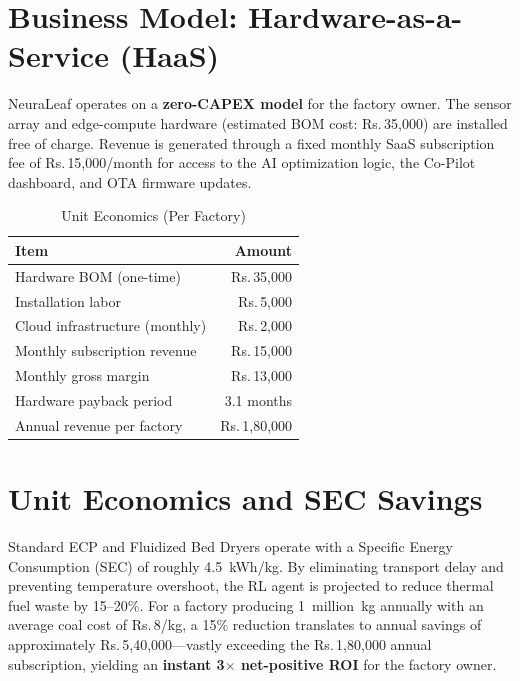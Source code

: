 ﻿\documentclass[12pt, a4paper]{report}
\newcommand{\rupee}{\textrm{Rs.\,}}
\begin{document}
\section{Business Model: Hardware-as-a-Service (HaaS)}
NeuraLeaf operates on a \textbf{zero-CAPEX model} for the factory owner. The sensor array and edge-compute hardware (estimated BOM cost: \rupee 35,000) are installed free of charge. Revenue is generated through a fixed monthly SaaS subscription fee of \rupee 15,000/month for access to the AI optimization logic, the Co-Pilot dashboard, and OTA firmware updates.

\begin{table}[H]
\centering
\caption{Unit Economics (Per Factory)}
\label{tab:unit_econ}
\begin{tabular}{@{}lr@{}}
\toprule
\textbf{Item} & \textbf{Amount} \\
\midrule
Hardware BOM (one-time) & \rupee 35,000 \\
Installation labor & \rupee 5,000 \\
Cloud infrastructure (monthly) & \rupee 2,000 \\
Monthly subscription revenue & \rupee 15,000 \\
Monthly gross margin & \rupee 13,000 \\
Hardware payback period & 3.1 months \\
Annual revenue per factory & \rupee 1,80,000 \\
\bottomrule
\end{tabular}
\end{table}

\section{Unit Economics and SEC Savings}
Standard ECP and Fluidized Bed Dryers operate with a Specific Energy Consumption (SEC) of roughly 4.5~kWh/kg. By eliminating transport delay and preventing temperature overshoot, the RL agent is projected to reduce thermal fuel waste by 15--20\%. For a factory producing 1~million~kg annually with an average coal cost of \rupee 8/kg, a 15\% reduction translates to annual savings of approximately \rupee 5,40,000---vastly exceeding the \rupee 1,80,000 annual subscription, yielding an \textbf{instant 3$\times$ net-positive ROI} for the factory owner.
\end{document}
